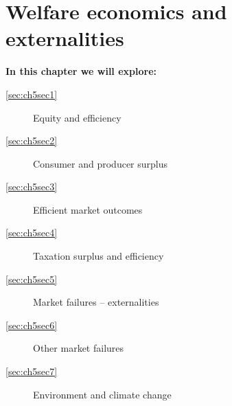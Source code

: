 \chapter{Welfare economics and externalities}\label{chap:welfare}

\begin{topics}
\textbf{In this chapter we will explore:}
\begin{description}
\item[\ref{sec:ch5sec1}] Equity and efficiency
\item[\ref{sec:ch5sec2}] Consumer and producer surplus
\item[\ref{sec:ch5sec3}] Efficient market outcomes
\item[\ref{sec:ch5sec4}] Taxation surplus and efficiency
\item[\ref{sec:ch5sec5}] Market failures -- externalities
\item[\ref{sec:ch5sec6}] Other market failures
\item[\ref{sec:ch5sec7}] Environment and climate change
\end{description}
\end{topics}